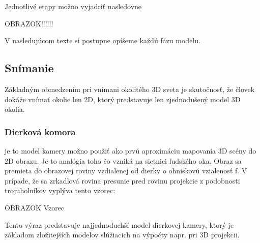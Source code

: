 Jednotlivé etapy možno vyjadriť nasledovne

OBRAZOK!!!!!!

V nasledujúcom texte si postupne opíšeme každú fázu modelu. 


\subsection{Snímanie}
Základným obmedzením pri vnímani okolitého 3D sveta je skutočnosť, že človek dokáže vnímať okolie len 2D, ktorý predstavuje len zjednodušený model 3D okolia.


\subsubsection{Dierková komora} je to model kamery možno použiť ako prvú aproximáciu mapovania 3D scény do 2D obrazu. Je to analógia toho čo vzniká na sietnici ľudského oka. Obraz sa premieta do obrazovej roviny vzdialenej od dierky o ohniskovú vzialenosť f. V prípade, že sa zrkadlová rovina presunie pred rovinu projekcie z podobnosti trojuholníkov vyplýva tento vzorec:



OBRAZOK Vzorec


Tento výraz predstavuje najjednoduchší model dierkovej kamery, ktorý je základom zložitejších modelov slúžiacich na výpočty napr. pri 3D projekcii. 


